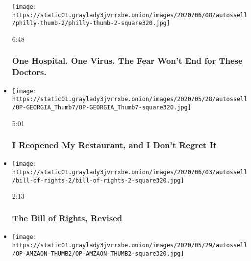 \begin{itemize}
  \texttt{[image: https://static01.graylady3jvrrxbe.onion/images/2020/06/08/autossell/philly-thumb-2/philly-thumb-2-square320.jpg]}

  6:48

  \hypertarget{one-hospital-one-virus-the-fear-wont-end-for-these-doctors}{%
  \subsubsection{One Hospital. One Virus. The Fear Won't End for These
  Doctors.}\label{one-hospital-one-virus-the-fear-wont-end-for-these-doctors}}
\item
  \href{https://www.nytimes3xbfgragh.onion/video/opinion/100000007161418/coronavirus-georgia-restaurant-reopening.html?action=click\&module=video-series-bar\&region=header\&pgtype=Article\&playlistId=video/opinion}{}

  \texttt{[image: https://static01.graylady3jvrrxbe.onion/images/2020/05/28/autossell/OP-GEORGIA\_Thumb7/OP-GEORGIA\_Thumb7-square320.jpg]}

  5:01

  \hypertarget{i-reopened-my-restaurant-and-i-dont-regret-it}{%
  \subsubsection{I Reopened My Restaurant, and I Don't Regret
  It}\label{i-reopened-my-restaurant-and-i-dont-regret-it}}
\item
  \href{https://www.nytimes3xbfgragh.onion/video/opinion/100000007171122/protests-constitutional-rights.html?action=click\&module=video-series-bar\&region=header\&pgtype=Article\&playlistId=video/opinion}{}

  \texttt{[image: https://static01.graylady3jvrrxbe.onion/images/2020/06/03/autossell/bill-of-rights-2/bill-of-rights-2-square320.jpg]}

  2:13

  \hypertarget{the-bill-of-rights-revised}{%
  \subsubsection{The Bill of Rights,
  Revised}\label{the-bill-of-rights-revised}}
\item
  \href{https://www.nytimes3xbfgragh.onion/video/opinion/100000007161402/coronavirus-amazon-hazard-pay.html?action=click\&module=video-series-bar\&region=header\&pgtype=Article\&playlistId=video/opinion}{}

  \texttt{[image: https://static01.graylady3jvrrxbe.onion/images/2020/05/29/autossell/OP-AMZAON-THUMB2/OP-AMZAON-THUMB2-square320.jpg]}


\end{itemize}
